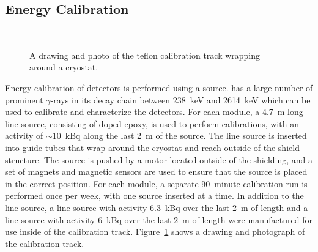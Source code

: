 \documentclass[/main.tex]{subfiles}
\begin{document}
\subsection{Energy Calibration} \label{sec:calibration}
\begin{figure}
  \centering
  ~
  \caption[Calibration track]{\label{fig:caltrack}
    A drawing and photo of the teflon calibration track wrapping around a cryostat.
  }
\end{figure}
Energy calibration of detectors is performed using a  source\cite{mjdcalibration}.
 has a large number of prominent $\gamma$-rays in its decay chain between 238~keV and 2614~keV which can be used to calibrate and characterize the detectors.
For each module, a 4.7~m long line source, consisting of  doped epoxy, is used to perform calibrations, with an activity of $\sim10$~kBq along the last 2~m of the source.
The line source is inserted into guide tubes that wrap around the cryostat and reach outside of the shield structure.
The source is pushed by a motor located outside of the shielding, and a set of magnets and magnetic sensors are used to ensure that the source is placed in the correct position.
For each module, a separate 90~minute calibration run is performed once per week, with one source inserted at a time.
In addition to the  line source, a  line source with activity 6.3~kBq over the last 2~m of length and a  line source with activity 6~kBq over the last 2~m of length were manufactured for use inside of the calibration track.
Figure~\ref{fig:caltrack} shows a drawing and photograph of the calibration track.
\end{document}
